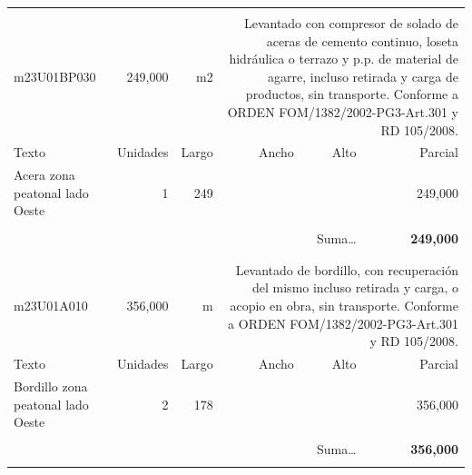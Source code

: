 \documentclass{book}%
\begin{document}
\begin{longtable}{lrrrrr}
&&&&&\\%
m23U01BP030&   249,000& m2&\multicolumn{3}{p{6cm}}{\scriptsize Levantado con compresor de solado de aceras de cemento continuo, loseta hidráulica o terrazo y p.p. de material de agarre, incluso retirada y carga de productos, sin transporte. Conforme a ORDEN FOM/1382/2002-PG3-Art.301 y RD 105/2008.\normalsize}\\%
Texto&Unidades&Largo&Ancho&Alto&Parcial\\%
\hline%
\multicolumn{1}{p{3.5cm}}{Acera  zona peatonal lado Oeste}&1&249&&&   249,000\\%
&&&&&\\%
\multicolumn{5}{r}{Suma\ldots}&\textbf{   249,000}\\%
\hline%
&&&&&\\%
&&&&&\\%
m23U01A010&   356,000& m&\multicolumn{3}{p{6cm}}{\scriptsize Levantado de bordillo, con recuperación del mismo incluso retirada y carga, o acopio en obra, sin transporte. Conforme a ORDEN FOM/1382/2002-PG3-Art.301 y RD 105/2008.\normalsize}\\%
Texto&Unidades&Largo&Ancho&Alto&Parcial\\%
\hline%
\multicolumn{1}{p{3.5cm}}{Bordillo  zona peatonal lado Oeste}&2&178&&&   356,000\\%
&&&&&\\%
\multicolumn{5}{r}{Suma\ldots}&\textbf{   356,000}\\%
\hline%
&&&&&\\%
\end{longtable}%
\newpage

%
\end{document}
